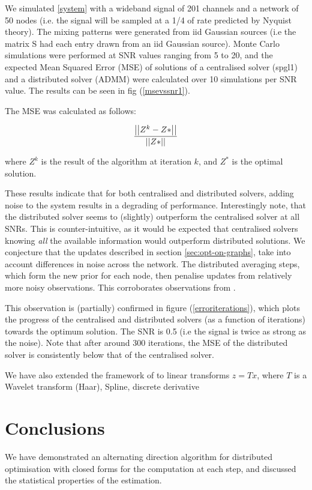 \documentclass{article}
\begin{document}
 We simulated \eqref{system} with a wideband signal of 201 channels and a network of 50 nodes (i.e. the signal will be sampled at a 1/4 of rate predicted by Nyquist theory). The mixing patterns were generated from iid Gaussian sources (i.e the matrix S had each entry drawn from an iid Gaussian source). Monte Carlo simulations were performed at SNR values ranging from 5 to 20, and the expected Mean Squared Error (MSE) of solutions of a centralised solver (spgl1) and a distributed solver (ADMM) were calculated over 10 simulations per SNR value. The results can be seen in fig (\ref{msevssnr1}). 

The MSE was calculated as follows:

\begin{equation}
\frac{\left|\left|Z^k - Z*\right|\right|}{\left|\left|Z*\right|\right|}
\end{equation}

where \(Z^k\) is the result of the algorithm at iteration \(k\), and \(Z^*\) is the optimal solution.

These results indicate that for both centralised and distributed solvers, adding noise to the system results in a degrading of performance. Interestingly note, that the distributed solver seems to (slightly) outperform the centralised solver at all SNRs. This is counter-intuitive, as it would be expected that centralised solvers knowing \textit{all} the available information would outperform distributed solutions. We conjecture that the updates described in section \eqref{sec:opt-on-graphs}, take into account differences in noise across the network. The distributed averaging steps, which form the new prior for each node, then penalise updates from relatively more noisy observations. This corroborates observations from \cite{bazerque2008}.

This observation is (partially) confirmed in figure (\ref{erroriterations}), which plots the progress of the centralised and distributed solvers (as a function of iterations) towards the optimum solution. The SNR is 0.5 (i.e the signal is twice as strong as the noise). Note that after around 300 iterations, the MSE of the distributed solver is consistently below that of the centralised solver.

We have also extended the framework of \cite{mishali2010theory} to linear transforms \(z = Tx\), where \(T\) is a Wavelet transform (Haar), Spline, discrete derivative 

\section{Conclusions}
We have demonstrated an alternating direction algorithm for distributed optimisation with closed forms for the computation at each step, and discussed the statistical properties of the estimation. 
\end{document}

